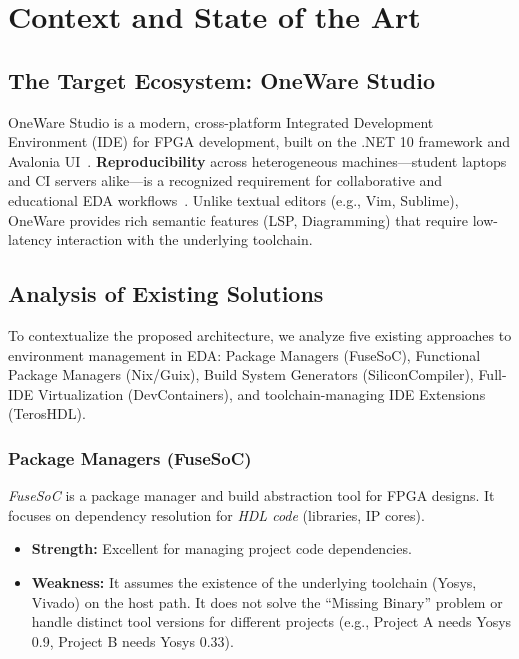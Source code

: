 
\chapter{Context and State of the Art}
\label{ch:stateoftheart}

\section{The Target Ecosystem: OneWare Studio}
OneWare Studio is a modern, cross-platform Integrated Development Environment (IDE) for FPGA development, built on the .NET 10 framework and Avalonia UI~\cite{dotnet10}. \textbf{Reproducibility} across heterogeneous machines---student laptops and CI servers alike---is a recognized requirement for collaborative and educational EDA workflows~\cite{boettiger2015introduction}. Unlike textual editors (e.g., Vim, Sublime), OneWare provides rich semantic features (LSP, Diagramming) that require low-latency interaction with the underlying toolchain.
\section{Analysis of Existing Solutions}
To contextualize the proposed architecture, we analyze five existing approaches to environment management in EDA: Package Managers (FuseSoC), Functional Package Managers (Nix/Guix), Build System Generators (SiliconCompiler), Full-IDE Virtualization (DevContainers), and toolchain-managing IDE Extensions (TerosHDL).

\subsection{Package Managers (FuseSoC)}
\textit{FuseSoC} is a package manager and build abstraction tool for FPGA designs. It focuses on dependency resolution for \textit{HDL code} (libraries, IP cores).
\begin{itemize}
    \item \textbf{Strength:} Excellent for managing project code dependencies.
    \item \textbf{Weakness:} It assumes the existence of the underlying toolchain (Yosys, Vivado) on the host path. It does not solve the ``Missing Binary'' problem or handle distinct tool versions for different projects (e.g., Project A needs Yosys 0.9, Project B needs Yosys 0.33).
\end{itemize}

